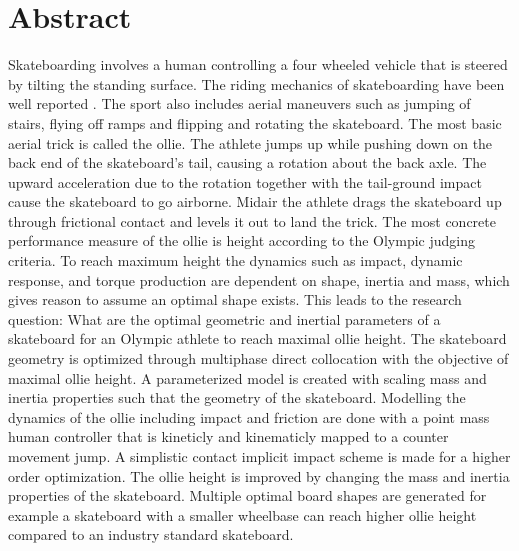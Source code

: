 \documentclass[twocolumn,10pt,twoside]{asme2ej}
\begin{document}
\newpage
\thispagestyle{plain}

\section*{Abstract}
Skateboarding involves a human controlling a four wheeled vehicle that is steered by tilting the standing surface. The riding mechanics of skateboarding have been well reported \cite{hubbard_clearing_1985,varszegi_stabilizing_2016}. The sport also includes aerial maneuvers such as jumping of stairs, flying off ramps and flipping and rotating the skateboard. The most basic aerial trick is called the ollie. The athlete jumps up while pushing down on the back end of the skateboard’s tail, causing a rotation about the back axle. The upward acceleration due to the rotation together with the tail-ground impact cause the skateboard to go airborne. Midair the athlete drags the skateboard up through frictional contact and levels it out to land the trick. The most concrete performance measure of the ollie is height according to the Olympic judging criteria\cite{world_skate_skateboarding_2021}. To reach maximum height the dynamics such as impact, dynamic response, and torque production are dependent on shape, inertia and mass, which gives reason to assume an optimal shape exists. This leads to the research question: What are the optimal geometric and inertial parameters of a skateboard for an Olympic athlete to reach
maximal ollie height. The skateboard geometry is optimized through multiphase direct collocation with the objective of maximal ollie height. A parameterized model is created with scaling mass and inertia properties such that the geometry of the skateboard. Modelling the dynamics of the ollie including impact and friction are done with a point mass human controller that is kineticly and kinematicly mapped to a counter movement jump. A simplistic contact implicit impact scheme is made for a higher order optimization. The ollie height is improved by changing the mass and inertia properties of the skateboard. Multiple optimal board shapes are generated for example a skateboard with a smaller wheelbase can reach higher ollie height compared to an industry standard skateboard.
\vspace{2cm}
\end{document}

